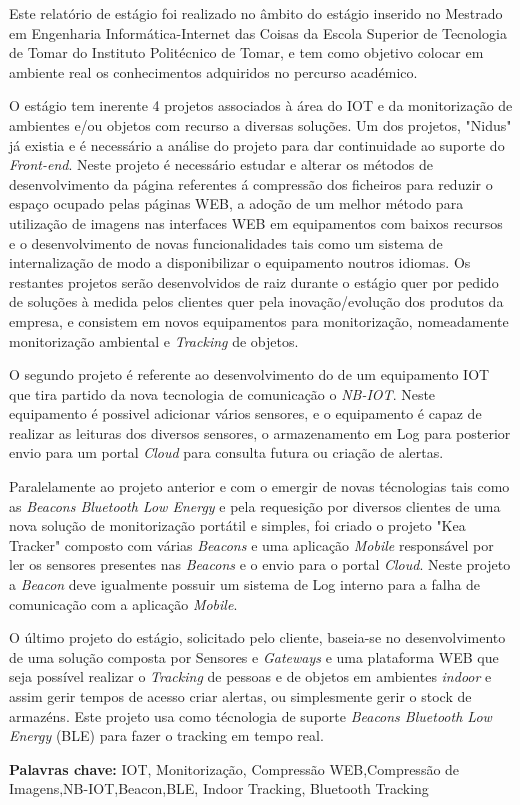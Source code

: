 
\vspace{1cm}
\noindent
\par Este relatório de estágio foi realizado no âmbito do estágio inserido no Mestrado em Engenharia Informática-Internet das Coisas da Escola Superior de Tecnologia de Tomar do Instituto Politécnico de Tomar, e tem como objetivo colocar em ambiente real os conhecimentos adquiridos no percurso académico.
\par
O estágio tem inerente 4 projetos associados à área do IOT e da monitorização de ambientes e/ou objetos com recurso a diversas soluções. Um dos projetos, "Nidus" já existia e é necessário a análise do projeto para dar continuidade ao suporte do \textit{Front-end}. Neste projeto é necessário estudar e alterar os métodos de desenvolvimento da página referentes á compressão dos ficheiros para reduzir o espaço ocupado pelas páginas WEB, a adoção de um melhor método para utilização de imagens nas interfaces WEB em equipamentos com baixos recursos e o desenvolvimento de novas funcionalidades tais como um sistema de internalização de modo a disponibilizar o equipamento noutros idiomas. Os restantes projetos serão desenvolvidos de raiz durante o estágio quer por pedido de soluções à medida pelos clientes quer pela inovação/evolução dos produtos da empresa, e consistem em novos equipamentos para monitorização, nomeadamente monitorização ambiental e \textit{Tracking} de objetos.
\par O segundo projeto é referente ao desenvolvimento do de um equipamento IOT que tira partido da nova tecnologia de comunicação o \textit{NB-IOT}. Neste equipamento é possivel adicionar vários sensores, e o equipamento é capaz de realizar as leituras dos diversos sensores, o armazenamento em Log para posterior envio para um portal \textit{Cloud} para consulta futura ou criação de alertas.
\par Paralelamente ao projeto anterior e com o emergir de novas técnologias tais como as \textit{Beacons Bluetooth Low Energy} e pela requesição por diversos clientes de uma nova solução de monitorização portátil e simples, foi criado o projeto "Kea Tracker" composto com várias \textit{Beacons} e uma aplicação \textit{Mobile} responsável por ler os sensores presentes nas \textit{Beacons} e o envio para o portal \textit{Cloud}. Neste projeto a \textit{Beacon} deve igualmente possuir um sistema de Log interno para a falha de comunicação com a aplicação \textit{Mobile}.
\par O último projeto do estágio, solicitado pelo cliente, baseia-se no desenvolvimento de uma solução composta por Sensores e \textit{Gateways} e uma plataforma WEB que seja possível realizar o \textit{Tracking} de pessoas e de objetos em ambientes \textit{indoor} e assim gerir tempos de acesso criar alertas, ou simplesmente gerir o stock de armazéns. Este projeto usa como técnologia de suporte \textit{Beacons Bluetooth Low Energy} (BLE) para fazer o tracking em tempo real.




\bigskip

\textbf{Palavras chave:}
IOT, Monitorização, Compressão WEB,Compressão de Imagens,NB-IOT,Beacon,BLE, Indoor Tracking, Bluetooth Tracking

